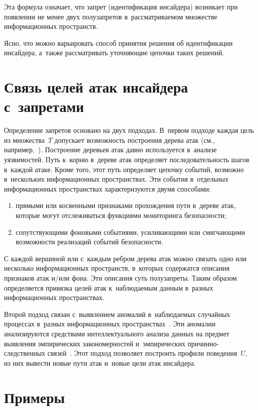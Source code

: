 \begin{multicols}{2}
  Эта формула означает, что запрет (идентификация инсайдера) возникает при 
появлении не менее двух полузапретов в~рассматриваемом множестве 
информационных пространств. 
  
  Ясно, что можно варьировать способ принятия решения об идентификации 
инсайдера, а~также рассматривать уточняющие цепочки таких решений. 
  
\section{Связь целей атак инсайдера с~запретами}

  Определение запретов основано на двух подходах. В~первом подходе каждая 
цель из множества~$T$ допускает возможность построения дерева атак (см., 
например,~\cite{11-gr}). Построение деревьев атак давно используется 
в~анализе уязвимостей. Путь к~корню в~дереве атак определяет 
последовательность шагов в~каждой атаке. Кроме того, этот путь определяет 
цепочку событий, возможно в~нескольких информационных пространствах. 
Эти события в~отдельных информационных пространствах характеризуются 
двумя способами:
  \begin{enumerate}[(1)]
\item прямыми или косвенными признаками прохождения пути в~дереве 
атак, которые могут отслеживаться функциями мониторинга без\-опас\-ности;
\item сопутствующими фоновыми событиями, усиливающими или 
смягчающими возможности реализаций событий без\-опас\-ности.
\end{enumerate}

  С каждой вершиной или с~каждым ребром дерева атак можно связать одно 
или несколько информационных пространств, в~которых содержатся описания 
признаков атак и/или фона. Эти описания суть полузапреты. Таким образом 
определяется привязка целей атак к~наблюдаемым данным в~разных 
информационных пространствах.
  
  Второй подход связан с~выявлением аномалий в~наблюдаемых случайных 
процессах в~разных информационных пространствах~\cite{12-gr}. Эти 
аномалии анализируются средствами интеллектуального анализа данных на 
предмет выявления эмпирических закономерностей и~эмпирических 
при\-чин\-но-след\-ст\-вен\-ных связей~\cite{13-gr, 14-gr}. Этот подход позволяет построить 
профили поведения~$U$, из них вывести новые пути атак и~новые цели атак 
инсайдера. 
  
\section{Примеры}


\end{multicols}
